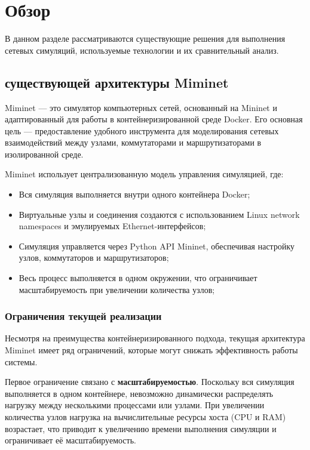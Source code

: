 
\section{Обзор}
\label{sec:relatedworks}

В данном разделе рассматриваются существующие решения для выполнения сетевых симуляций, используемые технологии и их сравнительный анализ.

\subsection{существующей архитектуры Miminet}

Miminet — это симулятор компьютерных сетей, основанный на Mininet и адаптированный для работы в контейнеризированной среде Docker.
Его основная цель — предоставление удобного инструмента для моделирования сетевых взаимодействий между узлами, коммутаторами и маршрутизаторами в изолированной среде.

Miminet использует централизованную модель управления симуляцией, где:
\begin{itemize}
    \item Вся симуляция выполняется внутри одного контейнера Docker;
    \item Виртуальные узлы и соединения создаются с использованием Linux network namespaces и эмулируемых Ethernet-интерфейсов;
    \item Симуляция управляется через Python API Mininet, обеспечивая настройку узлов, коммутаторов и маршрутизаторов;
    \item Весь процесс выполняется в одном окружении, что ограничивает масштабируемость при увеличении количества узлов;
\end{itemize}

\subsubsection{Ограничения текущей реализации}

Несмотря на преимущества контейнеризированного подхода, текущая архитектура Miminet имеет ряд ограничений, которые могут снижать эффективность работы системы.

Первое ограничение связано с \textbf{масштабируемостью}. Поскольку вся симуляция выполняется в одном контейнере, невозможно динамически распределять нагрузку между несколькими процессами или узлами. При увеличении количества узлов нагрузка на вычислительные ресурсы хоста (CPU и RAM) возрастает, что приводит к увеличению времени выполнения симуляции и ограничивает её масштабируемость.

